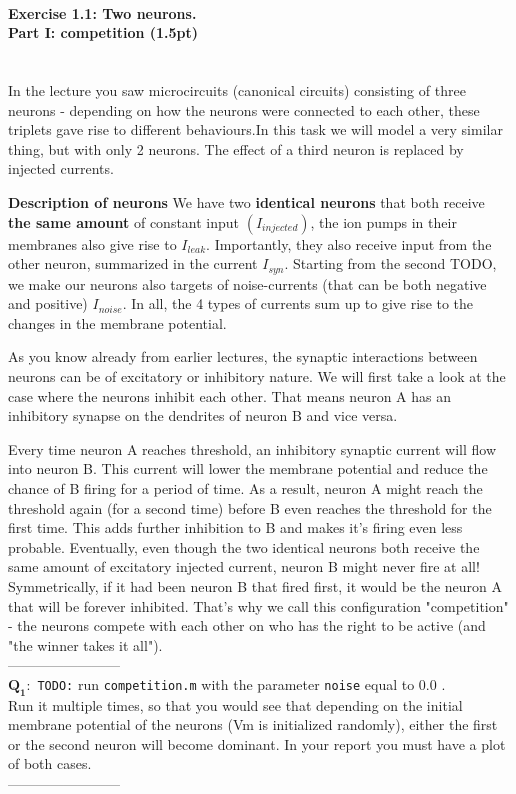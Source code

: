 \documentclass[a4paper,11pt]{article}
\newenvironment{exercise}[3]{\paragraph{Exercise #1: #2 (#3pt)}\ \\}{
\medskip}
\newcommand{\question}[2]{\setlength\parindent{10mm}\ \\$\mathbf{Q_#1:}$ #2\ \\}
\begin{document}
%
%
\begin{exercise}{1.1}{Two neurons. \\Part I: competition}{1.5}
In the lecture you saw microcircuits (canonical circuits) consisting of three neurons - depending on how the neurons were connected to each other, these triplets gave rise to different behaviours.In this task we will model a very similar thing, but with only 2 neurons. The effect of a third neuron is replaced by injected currents.

\textbf{Description of neurons} We have two \textbf{identical neurons} that both receive \textbf{the same amount} of constant input $(I_{injected})$, the ion pumps in their membranes also give rise to $I_{leak}$. Importantly, they also receive input from the other neuron, summarized in the current $I_{syn}$. Starting from the second TODO, we make our neurons also targets of noise-currents (that can be both negative and positive) $I_{noise}$. In all, the 4 types of currents sum up to give rise to the changes in the membrane potential.

As you know already from earlier lectures, the synaptic interactions between neurons can be of excitatory or inhibitory nature. We will first take a look at the case where the neurons inhibit each other. That means neuron A has an inhibitory synapse on the dendrites of neuron B and vice versa. 

Every time neuron A reaches threshold, an inhibitory synaptic current will flow into neuron B. This current will lower the membrane potential and reduce the chance of B firing for a period of time. As a result, neuron A might reach the threshold again (for a second time) before B even reaches the threshold for the first time. This adds further inhibition to B and makes it's firing even less probable. Eventually, even though the two identical neurons both receive the same amount of excitatory injected current, neuron B might never fire at all! Symmetrically, if it had been neuron B that fired first, it would be the neuron A that will be forever inhibited. That's why we call this configuration "competition" - the neurons compete with each other on who has the right to be active (and "the winner takes it all").\\
------------------------
\question{1}{ 
\texttt{TODO:} run \texttt{competition.m} with the parameter \texttt{noise} equal to $0.0$ . \\
Run it multiple times, so that you would see that depending on the initial membrane potential of the neurons (Vm is initialized randomly), either the first or the second neuron will become dominant. In your report you must have a plot of both cases.}
------------------------\\



\end{exercise}
\end{document}
